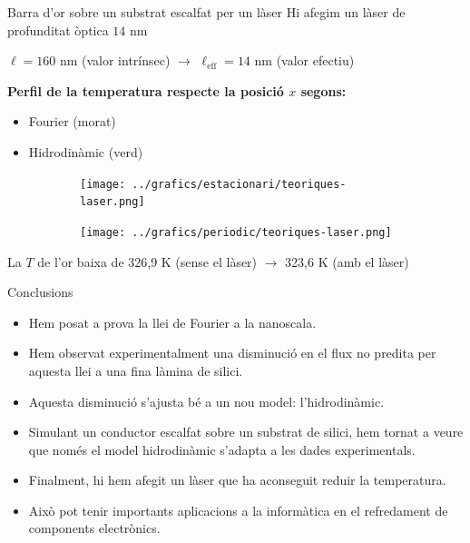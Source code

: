 \documentclass{beamer}
\begin{document}
\begin{frame}{Barra d'or sobre un substrat escalfat per un l\`{a}ser}
Hi afegim un l\`{a}ser de profunditat \`{o}ptica $14$ nm

$\ell=160$ nm (valor intr\'{i}nsec) $\longrightarrow$ $\ell_{\text{eff}}=14$ nm (valor efectiu)
\pause

\begin{center}\textbf{Perfil de la temperatura respecte la posici\'{o} $x$ segons:}\end{center}
\vspace{-5mm}
\begin{itemize}
\item Fourier (morat)
\item Hidrodin\`{a}mic (verd)
\end{itemize}
\begin{figure}
\begin{center}
\begin{subfigure}{0.49\textwidth}
\vspace{-2mm}
\texttt{[image: ../grafics/estacionari/teoriques-laser.png]}
\end{subfigure}
\begin{subfigure}{0.49\textwidth}
\vspace{-2mm}
\texttt{[image: ../grafics/periodic/teoriques-laser.png]}
\end{subfigure}
\end{center}
\end{figure}
\pause
La $T$ de l'or baixa de 326,9 K (sense el l\`{a}ser) $\longrightarrow$ 323,6 K (amb el l\`{a}ser)
\end{frame}

\begin{frame}{Conclusions}
\begin{itemize}
\item Hem posat a prova la llei de Fourier a la nanoscala.
\pause
\item Hem observat experimentalment una disminuci\'{o} en el flux no predita per aquesta llei a una fina l\`{a}mina de silici.
\pause
\item Aquesta disminuci\'{o} s'ajusta b\'{e} a un nou model: l'hidrodin\`{a}mic.
\pause
\item Simulant un conductor escalfat sobre un substrat de silici, hem tornat a veure que nom\'{e}s el model hidrodin\`{a}mic s'adapta a les dades experimentals.
\pause
\item Finalment, hi hem afegit un l\`{a}ser que ha aconseguit reduir la temperatura.
\pause
\item Aix\`{o} pot tenir importants aplicacions a la inform\`{a}tica en el refredament de components electr\`{o}nics.
\end{itemize}
\end{frame}
\end{document}
